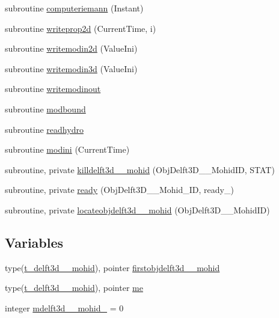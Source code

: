 \begin{DoxyCompactItemize}
\item 
subroutine \mbox{\hyperlink{namespacemoduledelft3d__2__mohid_a8f4d8b92955d25ef364cc44d4647b9c8}{computeriemann}} (Instant)
\item 
subroutine \mbox{\hyperlink{namespacemoduledelft3d__2__mohid_a21830963ef76515bef7bb6ae8f5fb77b}{writeprop2d}} (Current\+Time, i)
\item 
subroutine \mbox{\hyperlink{namespacemoduledelft3d__2__mohid_a80eedb762138913565ab5df14043c948}{writemodin2d}} (Value\+Ini)
\item 
subroutine \mbox{\hyperlink{namespacemoduledelft3d__2__mohid_a5d66acc218cfe348245b89e3e6fac2f2}{writemodin3d}} (Value\+Ini)
\item 
subroutine \mbox{\hyperlink{namespacemoduledelft3d__2__mohid_aec1314b8bd41c0bb55a2be43ece5267d}{writemodinout}}
\item 
subroutine \mbox{\hyperlink{namespacemoduledelft3d__2__mohid_a3fc3c3a94f1ee827e72b2345af34c6b0}{modbound}}
\item 
subroutine \mbox{\hyperlink{namespacemoduledelft3d__2__mohid_a04640ef3827cfdf73681b2b4ed0f3884}{readhydro}}
\item 
subroutine \mbox{\hyperlink{namespacemoduledelft3d__2__mohid_ad00b6a867c663519cfa8ad6f6d2b3532}{modini}} (Current\+Time)
\item 
subroutine, private \mbox{\hyperlink{namespacemoduledelft3d__2__mohid_a6a2192c5c8e2b5565ca4a3b91cd0ff48}{killdelft3d\+\_\+\_\+mohid}} (Obj\+Delft3\+D\+\_\+\_\+\+Mohid\+ID, S\+T\+AT)
\item 
subroutine, private \mbox{\hyperlink{namespacemoduledelft3d__2__mohid_a6327ce6561d3a18563b847433529a19d}{ready}} (Obj\+Delft3\+D\+\_\+\_\+\+Mohid\+\_\+\+ID, ready\+\_\+)
\item 
subroutine, private \mbox{\hyperlink{namespacemoduledelft3d__2__mohid_a0d0310530ae347fadb6afd0f39d0b3d2}{locateobjdelft3d\+\_\+\_\+mohid}} (Obj\+Delft3\+D\+\_\+\_\+\+Mohid\+ID)
\end{DoxyCompactItemize}
\subsection*{Variables}
\begin{DoxyCompactItemize}
\item 
type(\mbox{\hyperlink{structmoduledelft3d__2__mohid_1_1t__delft3d__2__mohid}{t\+\_\+delft3d\+\_\+\_\+mohid}}), pointer \mbox{\hyperlink{namespacemoduledelft3d__2__mohid_af1b4c3216212abbf986929fa7c978543}{firstobjdelft3d\+\_\+\_\+mohid}}
\item 
type(\mbox{\hyperlink{structmoduledelft3d__2__mohid_1_1t__delft3d__2__mohid}{t\+\_\+delft3d\+\_\+\_\+mohid}}), pointer \mbox{\hyperlink{namespacemoduledelft3d__2__mohid_a3cd2049e28b3f96571671db89a326800}{me}}
\item 
integer \mbox{\hyperlink{namespacemoduledelft3d__2__mohid_a39591cd13432bc8e58a1892e3f7dc6a8}{mdelft3d\+\_\+\_\+mohid\+\_\+}} = 0
\end{DoxyCompactItemize}


